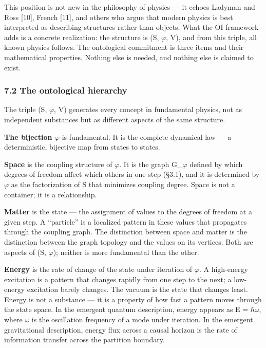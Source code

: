 \documentclass[
  11pt,
]{article}
\begin{document}
This position is not new in the philosophy of physics --- it echoes
Ladyman and Ross {[}10{]}, French {[}11{]}, and others who argue that
modern physics is best interpreted as describing structures rather than
objects. What the OI framework adds is a concrete realization: the
structure is (S, \ensuremath{\varphi}, V), and from this triple, all known physics follows.
The ontological commitment is three items and their mathematical
properties. Nothing else is needed, and nothing else is claimed to
exist.

\hypertarget{the-ontological-hierarchy}{%
\subsubsection{7.2 The ontological
hierarchy}\label{the-ontological-hierarchy}}

The triple (S, \ensuremath{\varphi}, V) generates every concept in fundamental physics, not
as independent substances but as different aspects of the same
structure.

\textbf{The bijection \ensuremath{\varphi}} is fundamental. It is the complete dynamical
law --- a deterministic, bijective map from states to states.

\textbf{Space} is the coupling structure of \ensuremath{\varphi}. It is the graph G\_\ensuremath{\varphi}
defined by which degrees of freedom affect which others in one step
(§3.1), and it is determined by \ensuremath{\varphi} as the factorization of S that
minimizes coupling degree. Space is not a container; it is a
relationship.

\textbf{Matter} is the state --- the assignment of values to the degrees
of freedom at a given step. A ``particle'' is a localized pattern in
these values that propagates through the coupling graph. The distinction
between space and matter is the distinction between the graph topology
and the values on its vertices. Both are aspects of (S, \ensuremath{\varphi}); neither is
more fundamental than the other.

\textbf{Energy} is the rate of change of the state under iteration of \ensuremath{\varphi}.
A high-energy excitation is a pattern that changes rapidly from one step
to the next; a low-energy excitation barely changes. The vacuum is the
state that changes least. Energy is not a substance --- it is a property
of how fast a pattern moves through the state space. In the emergent
quantum description, energy appears as E = \ensuremath{\hbar}\ensuremath{\omega}, where \ensuremath{\omega} is the
oscillation frequency of a mode under iteration. In the emergent
gravitational description, energy flux across a causal horizon is the
rate of information transfer across the partition boundary.
\end{document}
